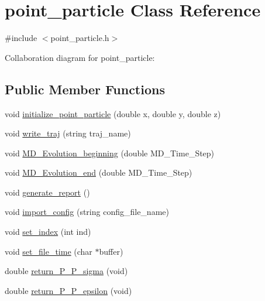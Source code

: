 \hypertarget{classpoint__particle}{}\section{point\+\_\+particle Class Reference}
\label{classpoint__particle}


{\ttfamily \#include $<$point\+\_\+particle.\+h$>$}



Collaboration diagram for point\+\_\+particle\+:
\subsection*{Public Member Functions}
\begin{DoxyCompactItemize}
\item 
void \mbox{\hyperlink{classpoint__particle_a8019c456768e1fbe70d56bd3821b2906}{initialize\+\_\+point\+\_\+particle}} (double x, double y, double z)
\item 
void \mbox{\hyperlink{classpoint__particle_a584056fafe834e7346e266d1a950e731}{write\+\_\+traj}} (string traj\+\_\+name)
\item 
void \mbox{\hyperlink{classpoint__particle_a2dae1b70a2fbfdf4f95abeb086e90d23}{M\+D\+\_\+\+Evolution\+\_\+beginning}} (double M\+D\+\_\+\+Time\+\_\+\+Step)
\item 
void \mbox{\hyperlink{classpoint__particle_a9e5a00664604811b19ead1af25cdcb21}{M\+D\+\_\+\+Evolution\+\_\+end}} (double M\+D\+\_\+\+Time\+\_\+\+Step)
\item 
void \mbox{\hyperlink{classpoint__particle_a8a89ec34d7dc2e1a54c3e0b58d23ff06}{generate\+\_\+report}} ()
\item 
void \mbox{\hyperlink{classpoint__particle_a40db3a07bcbe9888fc538a469f8b0708}{import\+\_\+config}} (string config\+\_\+file\+\_\+name)
\item 
void \mbox{\hyperlink{classpoint__particle_a4bbc110dabefccd51143ed68d4d7ba3f}{set\+\_\+index}} (int ind)
\item 
void \mbox{\hyperlink{classpoint__particle_aba09dcc4858f07bb455e8de1a7423734}{set\+\_\+file\+\_\+time}} (char $\ast$buffer)
\item 
double \mbox{\hyperlink{classpoint__particle_afebd9502e8c8106f2b5274378045965c}{return\+\_\+\+P\+\_\+\+P\+\_\+sigma}} (void)
\item 
double \mbox{\hyperlink{classpoint__particle_acbec3803b347d96c064862102b059209}{return\+\_\+\+P\+\_\+\+P\+\_\+epsilon}} (void)
\item 

\end{DoxyCompactItemize}
